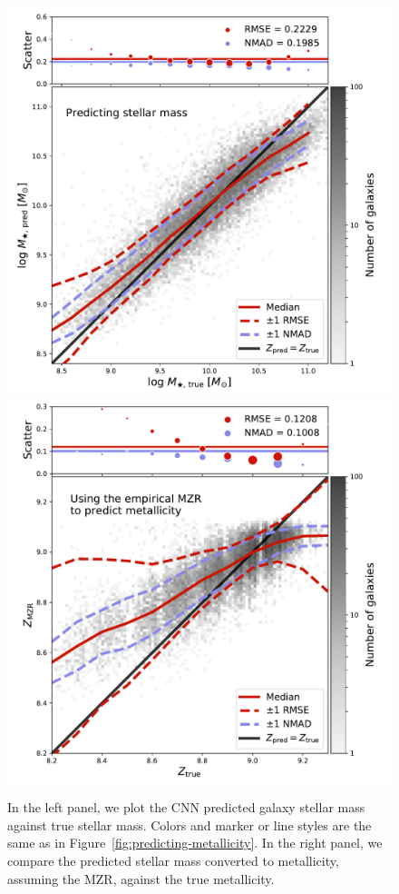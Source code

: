 \documentclass[fleqn,usenatbib]{mnras}
\begin{document}
\begin{figure}
	\includegraphics[width=\columnwidth]{05-a-prediction_mass.pdf}
	\includegraphics[width=\columnwidth]{05-b-prediction_mzr.pdf}
	\caption{\label{fig:mass-metallicity}
		In the left panel, we plot the CNN predicted galaxy stellar mass against true stellar mass. Colors and marker or line styles are the same as in Figure~\ref{fig:predicting-metallicity}. In the right panel, we compare the predicted stellar mass converted to metallicity, assuming the \citet{Tremonti2004} MZR, against the true metallicity.
		}
\end{figure}
\end{document}
